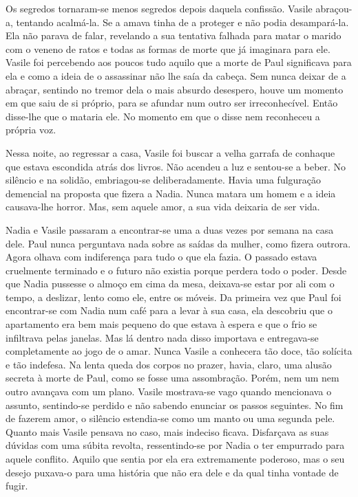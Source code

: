 Os segredos tornaram-se menos segredos depois daquela confissão. Vasile
abraçou-a, tentando acalmá-la. Se a amava
tinha de a proteger e não podia desampará-la. Ela não parava de falar,
revelando a sua tentativa falhada para matar o marido com o veneno de
ratos e todas as formas de morte que já imaginara para ele. Vasile foi
percebendo aos poucos tudo aquilo que a morte de Paul significava para
ela e como a ideia de o assassinar não lhe saía da cabeça. Sem nunca
deixar de a abraçar, sentindo no tremor dela o mais absurdo desespero,
houve um momento em que saiu de si próprio, para se afundar num outro
ser irreconhecível. Então disse-lhe que o mataria ele. No momento em
que o disse nem reconheceu a própria voz.

Nessa noite, ao regressar a casa, Vasile foi buscar a velha garrafa de
conhaque que estava escondida atrás dos livros. Não acendeu a luz e
sentou-se a beber. No silêncio e na solidão, embriagou-se
deliberadamente. Havia uma fulguração demencial na proposta que fizera a
Nadia. Nunca matara um homem e a ideia causava-lhe horror. Mas, sem
aquele amor, a sua vida deixaria de ser vida.

Nadia e Vasile passaram a encontrar-se uma a duas vezes por semana na
casa dele. Paul nunca perguntava nada sobre as saídas da mulher, como
fizera outrora. Agora olhava com indiferença para tudo o que ela fazia.
O passado estava cruelmente terminado e o futuro não existia porque
perdera todo o poder. Desde que Nadia pussesse o almoço em cima da mesa,
deixava-se estar por ali com o tempo, a deslizar, lento como ele, entre
os móveis. Da primeira vez que Paul foi encontrar-se com Nadia num café
para a levar à sua casa, ela descobriu que o apartamento era bem mais
pequeno do que estava à espera
e que o frio se infiltrava pelas janelas. Mas lá dentro nada disso
importava e entregava-se completamente ao jogo de o amar. Nunca Vasile a
conhecera tão doce, tão solícita e tão indefesa. Na lenta queda dos
corpos no prazer, havia, claro, uma alusão secreta à morte de Paul, como
se fosse uma assombração. Porém, nem um nem outro avançava com um plano.
Vasile mostrava-se vago quando mencionava o assunto, sentindo-se
perdido e não sabendo enunciar os passos seguintes. No fim de fazerem
amor, o silêncio estendia-se como um manto ou uma segunda pele. Quanto
mais Vasile pensava no caso, mais indeciso ficava. Disfarçava as suas
dúvidas com uma súbita revolta, ressentindo-se por Nadia o ter empurrado para aquele conflito. Aquilo que sentia
por ela era extremamente poderoso, mas o seu desejo puxava-o para uma
história que não era dele e da qual tinha vontade de fugir.


